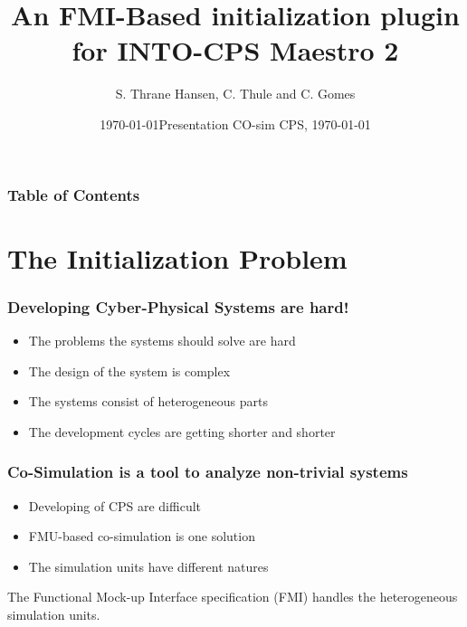 \documentclass{beamer}
\title[FMI-Based initialization plugin for Maestro 2] %
{An FMI-Based initialization plugin for INTO-CPS Maestro 2}
\date{\today}
\author[Thrane Hansen, Simon] %
{S. Thrane Hansen, C. Thule and C. Gomes}
\institute[AU] %
{
  Department of Engineering\\
  Aarhus University
}
\date[AU 2020] %
{Presentation CO-sim CPS, \today}
\begin{document}
\frame{\titlepage}

\begin{frame}
\frametitle{Table of Contents}
\tableofcontents
\end{frame}

\section{The Initialization Problem}
\begin{frame}
\frametitle{Developing Cyber-Physical Systems are hard!}
\begin{itemize}
    \item The problems the systems should solve are hard
    \item The design of the system is complex
    \item The systems consist of heterogeneous parts
    \item The development cycles are getting shorter and shorter
\end{itemize}

\end{frame}

\begin{frame}
\frametitle{Co-Simulation is a tool to analyze \textbf{non-trivial} systems}
\begin{itemize}
    \item Developing of CPS are difficult
    \item FMU-based co-simulation is one solution
    \item The simulation units have different natures
\end{itemize}
The Functional Mock-up Interface specification (FMI) handles the heterogeneous simulation units.

\end{frame}
\end{document}
